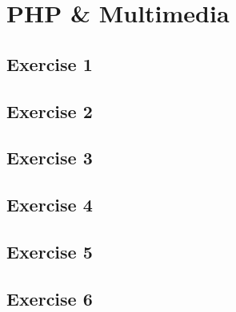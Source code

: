 \chapter{PHP \& Multimedia}
\graphicspath{{7-multimedia/images/}}

\section{Exercise 1}
\section{Exercise 2}
\section{Exercise 3}
\section{Exercise 4}
\section{Exercise 5}
\section{Exercise 6}
